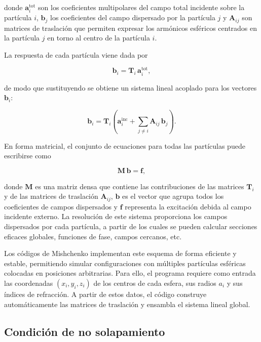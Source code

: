 \documentclass[12pt,a4paper]{article}
\begin{document}
donde $\mathbf{a}_i^{\text{tot}}$ son los coeficientes multipolares del campo total incidente sobre la partícula $i$, $\mathbf{b}_j$ los coeficientes del campo dispersado por la partícula $j$
y $\mathbf{A}_{ij}$ son matrices de traslación que permiten expresar los armónicos esféricos centrados en la partícula $j$ en torno al centro de la partícula $i$.

La respuesta de cada partícula viene dada por

\begin{equation}
  \mathbf{b}_i = \mathbf{T}_i \,\mathbf{a}_i^{\text{tot}},
\end{equation}

de modo que sustituyendo se obtiene un sistema lineal acoplado para los vectores $\mathbf{b}_i$:

\begin{equation}
  \mathbf{b}_i = \mathbf{T}_i \left( \mathbf{a}_i^{\text{inc}} + \sum_{j \neq i} \mathbf{A}_{ij}\,\mathbf{b}_j \right).
\end{equation}

En forma matricial, el conjunto de ecuaciones para todas las partículas puede escribirse como

\begin{equation}
  \mathbf{M}\,\mathbf{b} = \mathbf{f},
\end{equation}

donde $\mathbf{M}$ es una matriz densa que contiene las contribuciones de las matrices $\mathbf{T}_i$ y de las matrices de traslación $\mathbf{A}_{ij}$, $\mathbf{b}$ es el vector que agrupa
todos los coeficientes de campos dispersados y $\mathbf{f}$ representa la excitación debida al campo incidente externo.
La resolución de este sistema proporciona los campos dispersados por cada partícula, a partir de los cuales se pueden calcular secciones eficaces globales, funciones de fase,
campos cercanos, etc.

Los códigos de Mishchenko implementan este esquema de forma eficiente y estable, permitiendo simular configuraciones con múltiples partículas esféricas colocadas en posiciones arbitrarias.
Para ello, el programa requiere como entrada las coordenadas $(x_i,y_i,z_i)$ de los centros de cada esfera, sus radios $a_i$ y sus índices de refracción.
A partir de estos datos, el código construye automáticamente las matrices de traslación y ensambla el sistema lineal global.

\subsection{Condición de no solapamiento}
\end{document}
